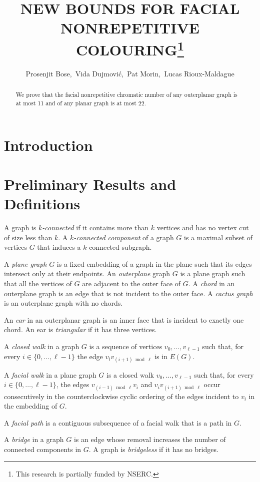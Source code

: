 \documentclass{patmorin}
\title{\MakeUppercase{New Bounds for Facial Nonrepetitive Colouring}\thanks{This research is partially funded by NSERC.}}
\author{Prosenjit Bose,\, Vida Dujmovi\'c,\, Pat Morin,\, Lucas Rioux-Maldague}
\begin{document}
\maketitle


\begin{abstract}
  We prove that the facial nonrepetitive chromatic number of any outerplanar graph is at most 11 and of any planar graph is at most 22.
\end{abstract}


\section{Introduction}

\section{Preliminary Results and Definitions}

A graph is \emph{$k$-connected} if it contains more than $k$ vertices and has
no vertex cut of size less than $k$.  A \emph{$k$-connected component} of a graph $G$ is a maximal subset of vertices $G$ that induces a $k$-connected subgraph.

A \emph{plane graph} $G$ is a fixed embedding of a graph in the plane such
that its edges intersect only at their endpoints. An \emph{outerplane}
graph $G$ is a plane graph such that all the vertices of $G$ are adjacent
to the outer face of $G$. A \emph{chord} in an outerplane graph is
an edge that is not incident to the outer face. A \emph{cactus graph}
is an outerplane graph with no chords.

An \emph{ear} in an outerplanar graph is an inner face that is incident to
exactly one chord. An ear is \emph{triangular} if it has three vertices.

A \emph{closed walk} in a graph $G$ is a sequence of vertices
$v_0,\ldots,v_{\ell-1}$ such that, for every $i\in\{0,\ldots,\ell-1\}$
the edge $v_iv_{(i+1)\bmod \ell}$ is in $E(G)$.

A \emph{facial walk} in a plane graph $G$ is a closed walk
$v_0,\ldots,v_{\ell-1}$ such that, for every $i\in\{0,\ldots,\ell-1\}$,
the edges $v_{(i-1)\bmod \ell} v_i$ and $v_iv_{(i+1)\bmod\ell}$ occur
consecutively in the counterclockwise cyclic ordering of the edges
incident to $v_i$ in the embedding of $G$.

A \emph{facial path} is a contiguous subsequence of a facial walk that
is a path in $G$.

A \emph{bridge} in a graph $G$ is an edge whose removal increases the number of connected components in $G$.  A graph is \emph{bridgeless} if it has no bridges.
\end{document}
